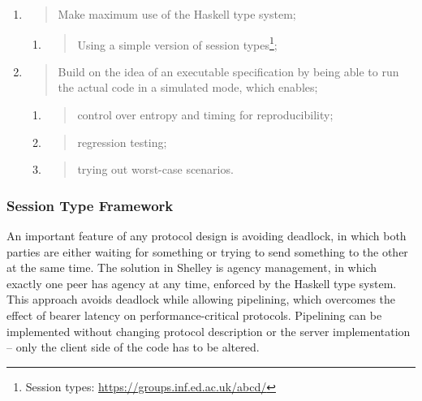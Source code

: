 \documentclass[11pt,a4paper]{article}
\begin{document}
\begin{enumerate}
\def\labelenumi{\arabic{enumi}.}
\item
  \begin{quote}
  Make maximum use of the Haskell type system;
  \end{quote}

  \begin{enumerate}
  \def\labelenumii{\alph{enumii}.}
  \item
    \begin{quote}
    Using a simple version of session types\footnote{Session types:
      \href{https://groups.inf.ed.ac.uk/abcd/}{{https://groups.inf.ed.ac.uk/abcd/}}};
    \end{quote}
  \end{enumerate}
\item
  \begin{quote}
  Build on the idea of an executable specification by being able to run
  the actual code in a simulated mode, which enables;
  \end{quote}

  \begin{enumerate}
  \def\labelenumii{\alph{enumii}.}
  \setcounter{enumii}{1}
  \item
    \begin{quote}
    control over entropy and timing for reproducibility;
    \end{quote}
  \item
    \begin{quote}
    regression testing;
    \end{quote}
  \item
    \begin{quote}
    trying out worst-case scenarios.
    \end{quote}
  \end{enumerate}
\end{enumerate}

\subsubsection{Session Type Framework}
\label{session-type-framework}

An important feature of any protocol design is avoiding deadlock, in
which both parties are either waiting for something or trying to send
something to the other at the same time. The solution in Shelley is
agency management, in which exactly one peer has agency at any time,
enforced by the Haskell type system. This approach avoids deadlock while
allowing pipelining, which overcomes the effect of bearer latency on
performance-critical protocols. Pipelining can be implemented without
changing protocol description or the server implementation -- only the
client side of the code has to be altered.
\end{document}
